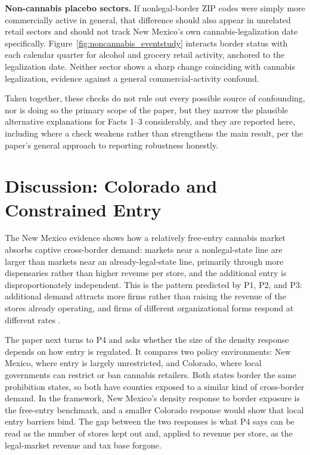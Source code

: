 \documentclass[english,12pt]{article}
\begin{document}
\textbf{Non-cannabis placebo sectors.} If nonlegal-border ZIP codes were simply more commercially active in general, that difference should also appear in unrelated retail sectors and should not track New Mexico's own cannabis-legalization date specifically. Figure~\ref{fig:noncannabis_eventstudy} interacts border status with each calendar quarter for alcohol and grocery retail activity, anchored to the legalization date. Neither sector shows a sharp change coinciding with cannabis legalization, evidence against a general commercial-activity confound.

Taken together, these checks do not rule out every possible source of confounding, nor is doing so the primary scope of the paper, but they narrow the plausible alternative explanations for Facts 1--3 considerably, and they are reported here, including where a check weakens rather than strengthens the main result, per the paper's general approach to reporting robustness honestly.

\FloatBarrier

\section{Discussion: Colorado and Constrained Entry}
\label{sec:discussion}

The New Mexico evidence shows how a relatively free-entry cannabis market absorbs captive cross-border demand: markets near a nonlegal-state line are larger than markets near an already-legal-state line, primarily through more dispensaries rather than higher revenue per store, and the additional entry is disproportionately independent. This is the pattern predicted by P1, P2, and P3: additional demand attracts more firms rather than raising the revenue of the stores already operating, and firms of different organizational forms respond at different rates \citep{BresnahanReiss1991}.

The paper next turns to P4 and asks whether the size of the density response depends on how entry is regulated. It compares two policy environments: New Mexico, where entry is largely unrestricted, and Colorado, where local governments can restrict or ban cannabis retailers. Both states border the same prohibition states, so both have counties exposed to a similar kind of cross-border demand. In the framework, New Mexico's density response to border exposure is the free-entry benchmark, and a smaller Colorado response would show that local entry barriers bind. The gap between the two responses is what P4 says can be read as the number of stores kept out and, applied to revenue per store, as the legal-market revenue and tax base forgone.
\end{document}
